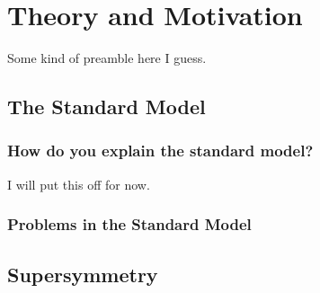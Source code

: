 
\chapter{Theory and Motivation} %

\label{ch:theory} %


Some kind of preamble here I guess.


\section{The Standard Model}


\subsection{How do you explain the standard model?}

I will put this off for now.

\subsection{Problems in the Standard Model}


\section{Supersymmetry}
